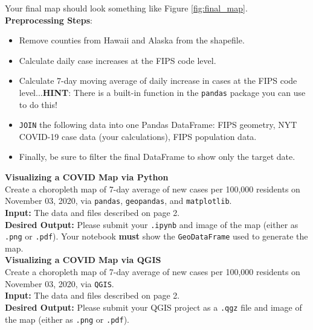 \documentclass{homework}
\begin{document}
Your final map should look something like Figure \ref{fig:final_map}. \\

\textbf{Preprocessing Steps}:
\begin{itemize}
    \item Remove counties from Hawaii and Alaska from the shapefile.
    \item Calculate daily case increases at the FIPS code level.
    \item Calculate 7-day moving average of daily increase in cases at the FIPS code level...\textbf{HINT}: There is a built-in function in the \verb|pandas| package you can use to do this!
    \item \verb|JOIN| the following data into one Pandas DataFrame: FIPS geometry, NYT COVID-19 case data (your calculations), FIPS population data.
    \item Finally, be sure to filter the final DataFrame to show only the target date.
\end{itemize}

\clearpage


\HWproblem
\textbf{Visualizing a COVID Map via Python}\\
Create a choropleth map of 7-day average of new cases per 100,000 residents on November 03, 2020, via \verb|pandas|, \verb|geopandas|, and \verb|matplotlib|.\\

\textbf{Input:} The data and files described on page 2.\\

\textbf{Desired Output:} Please submit your \verb|.ipynb| and image of the map (either as \verb|.png| or \verb|.pdf|). Your notebook \textbf{must} show the \verb|GeoDataFrame| used to generate the map.\\



\HWproblem
\textbf{Visualizing a COVID Map via QGIS}\\
Create a choropleth map of 7-day average of new cases per 100,000 residents on November 03, 2020, via \verb|QGIS|.\\

\textbf{Input:} The data and files described on page 2.\\

\textbf{Desired Output:} Please submit your QGIS project as a \verb|.qgz| file and image of the map (either as \verb|.png| or \verb|.pdf|).

\clearpage
\end{document}
